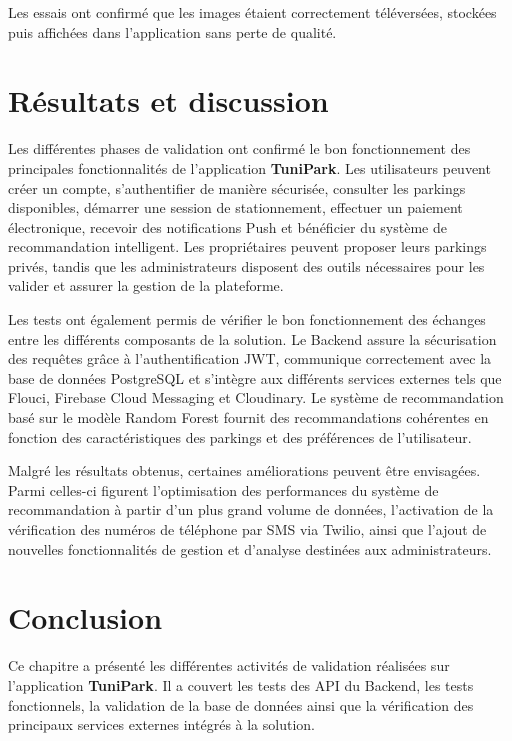 \par Les essais ont confirmé que les images étaient correctement téléversées, stockées puis affichées dans l'application sans perte de qualité.
\section{Résultats et discussion}

\par Les différentes phases de validation ont confirmé le bon fonctionnement des principales fonctionnalités de l'application \textbf{TuniPark}. Les utilisateurs peuvent créer un compte, s'authentifier de manière sécurisée, consulter les parkings disponibles, démarrer une session de stationnement, effectuer un paiement électronique, recevoir des notifications Push et bénéficier du système de recommandation intelligent. Les propriétaires peuvent proposer leurs parkings privés, tandis que les administrateurs disposent des outils nécessaires pour les valider et assurer la gestion de la plateforme.

\par Les tests ont également permis de vérifier le bon fonctionnement des échanges entre les différents composants de la solution. Le Backend assure la sécurisation des requêtes grâce à l'authentification JWT, communique correctement avec la base de données PostgreSQL et s'intègre aux différents services externes tels que Flouci, Firebase Cloud Messaging et Cloudinary. Le système de recommandation basé sur le modèle Random Forest fournit des recommandations cohérentes en fonction des caractéristiques des parkings et des préférences de l'utilisateur.

\par Malgré les résultats obtenus, certaines améliorations peuvent être envisagées. Parmi celles-ci figurent l'optimisation des performances du système de recommandation à partir d'un plus grand volume de données, l'activation de la vérification des numéros de téléphone par SMS via Twilio, ainsi que l'ajout de nouvelles fonctionnalités de gestion et d'analyse destinées aux administrateurs.

\section{Conclusion}

\par Ce chapitre a présenté les différentes activités de validation réalisées sur l'application \textbf{TuniPark}. Il a couvert les tests des API du Backend, les tests fonctionnels, la validation de la base de données ainsi que la vérification des principaux services externes intégrés à la solution.

